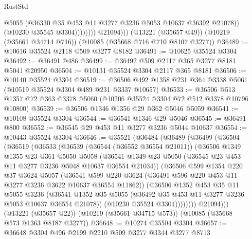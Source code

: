 \begin{lexlean}{RustStd}
\begin{coremodule}
                          @5055
                          (@36330 @35 @453 @11 @3277 @3236 @5053 @10637 @36392 @21078))
                        (@10230 @35545 @3304))))))))
          @21094)))
    (@13221 (@35657 @49))
    (@10219 (@35661 @34714 @716))
    (@10085 (@35668 @716 @710 @8107 @3277))
@36489 := @10616 @35524 @2118 @509 @3277 @8182
@36491 := @10625 @35524 @3304
@36492 := @36491 @486
@36499 := @36492 @509 @2117 @365 @3277 @8181 @5041 @20950
@36504 := @10131 @35524 @3304 @2117 @365 @8181
@36506 := @10140 @35524 @3304
@36519 := @36506 @492 @1358 @231 @364 @3338 @5061 (@10519 @35524 @3304 @489 @231 @3337 @10657)
@36533 := @36506 @513 @1357 @72 @363 @3378 @5060 (@10206 @35524 @3304 @72 @512 @3378 @10796 @10800)
@36539 := @36506 @1346 @1356 @29 @362 @5046 @5059
@36541 := @10108 @35524 @3304
@36544 := @36541 @1346 @29 @5046
@36545 := @36491 @800
@36552 := @36545 @29 @453 @11 @3277 @3236 @5044 @10637
@36554 := @10443 @35524 @3304
@36646 := @35521
    (@36484
      (@36489
        (@36499
          (@36504
            (@36519
              (@36533
                (@36539
                  (@36544 (@36552 @36554 @21011))
                  (@36506
                    @1349
                    @1355
                    @23
                    @361
                    @5050
                    @5058
                    (@36541
                      @1349
                      @23
                      @5050
                      (@36545 @23 @453 @11 @3277 @3236 @5048 @10637 @36554 @21034))
                    (@36506
                      @599
                      @1354
                      @220
                      @37
                      @3624
                      @5057
                      (@36541
                        @599
                        @220
                        @3624
                        (@36491 @596 @220 @453 @11 @3277 @3236 @3622 @10637 @36554 @11862))
                      (@36506
                        @1352
                        @453
                        @35
                        @11
                        @5055
                        @3236
                        (@36541
                          @1352
                          @35
                          @5055
                          (@36492 @35 @453 @11 @3277 @3236 @5053 @10637 @36554 @21078))
                        (@10230 @35524 @3304))))))))
          @21094)))
    (@13221 (@35657 @22))
    (@10219 (@35661 @34715 @573))
    (@10085 (@35668 @573 @1363 @8187 @3277))
@36648 := @10274 @35504 @3304
@36657 := @36648 @3304 @496 @2199 @2210 @509 @3277 @3344 @3277 @8713

\end{coremodule}
\end{lexlean}
